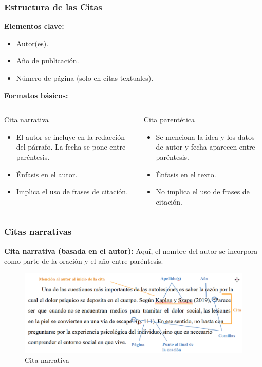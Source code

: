 \documentclass[
11pt, %
]{beamer}
\begin{document}
\begin{frame}
	\frametitle{Estructura de las Citas}

	\textbf{Elementos clave:}
	\begin{itemize}
		\item Autor(es).
		\item Año de publicación.
		\item Número de página (solo en citas textuales).
	\end{itemize}

	\textbf{Formatos básicos:}

		\begin{columns}[T] %
		\begin{block}{Cita narrativa}
			\begin{itemize}
				\item El autor se incluye en la redacción del párrafo. La fecha se pone entre paréntesis. \item Énfasis en el autor.
				\item Implica el uso de frases de citación.
			\end{itemize}
		\end{block}
		\vspace{0.1cm}
		\begin{block}{Cita parentética}
			\begin{itemize}
				\item Se menciona la idea y los datos de autor y fecha aparecen entre paréntesis.
				\item Énfasis en el texto.
				\item No implica el uso de frases de citación.
			\end{itemize}
		\end{block}
	\end{columns}

\end{frame}

\begin{frame}
	\frametitle{Citas narrativas}
	\textbf{Cita narrativa (basada en el autor):} Aquí, el nombre del autor se incorpora como parte de la oración y el año entre paréntesis.

	\begin{exampleblock}{}
\begin{figure}
	\centering
	\includegraphics[width=1\linewidth]{images/screenshot001}
	\caption{Cita narrativa}
	\label{fig:screenshot001}
\end{figure}

	\end{exampleblock}

\end{frame}
\end{document}
